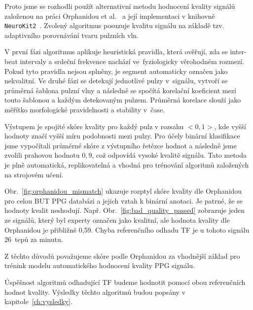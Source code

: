 Proto jsme se rozhodli použít alternativní metodu hodnocení kvality signálů založenou na práci Orphanidou et al.~\cite{Orphanidou2015} a její implementaci v knihovně \texttt{NeuroKit2}~\cite{NeuroKit2}.
Zvolený algoritmus posuzuje kvalitu signálu na základě tzv. adaptivního porovnávání tvaru pulzních vln.

V první fázi algoritmus aplikuje heuristická pravidla, která ověřují, zda se inter-beat intervaly a srdeční frekvence nachází ve~fyziologicky věrohodném rozmezí.
Pokud tyto pravidla nejsou splněny, je segment automaticky označen jako nekvalitní.
Ve druhé fázi se detekují jednotlivé pulzy v~signálu, vytvoří se průměrná šablona pulzní vlny a následně se spočítá korelační koeficient mezi touto šablonou a každým detekovaným pulzem.
Průměrná korelace slouží jako měřítko morfologické pravidelnosti a stability v~čase.

Výstupem je spojité skóre kvality pro každý pulz v rozsahu $<0,1>$, kde vyšší hodnoty značí vyšší míru podobnosti mezi pulzy.
Pro účely binární klasifikace jsme vypočítali průměrné skóre z výstupního řetězce hodnot a následně jsme zvolili prahovou hodnotu $0,9$, což odpovídá vysoké kvalitě signálu.
Tato metoda je plně automatická, replikovatelná a vhodná pro trénování algoritmů založených na strojovém učení.

Obr.~\ref{fig:orphanidou_mismatch} ukazuje rozptyl skóre kvality dle Orphanidou pro celou \acs{BUT PPG} databázi a jejich vztah k binární anotaci.
Je patrné, že se hodnoty kvalit neshodují.
Např. Obr.~\ref{fig:bad_quality_passed} zobrazuje jeden ze signálů, který byl experty označen jako kvalitní, ale hodnota kvality dle Orphanidou je přibližně 0,59.
Chyba referenčního odhadu \acs{TF} je u tohoto signálu 26~tepů za minutu.

Z těchto důvodů považujeme skóre podle Orphanidou za vhodnější základ pro trénink modelu automatického hodnocení kvality PPG signálu.

Úspěšnost algoritmů odhadující \acs{TF} budeme hodnotit pomocí obou referenčních hodnot kvality.
Výsledky těchto algoritmů budou popsány v kapitole~\ref{ch:vysledky}.

